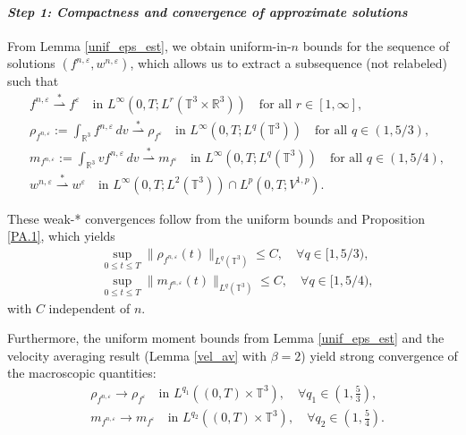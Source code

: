 \documentclass[10pt,reqno]{amsart}
\numberwithin{equation}{section}
\newcommand{\R}{\mathbb R}
\newcommand{\T}{\mathbb T}
\newcommand{\e}{\varepsilon}
\newcommand{\lt}{\left}
\newcommand{\rt}{\right}
\begin{document}
\paragraph{\it Step 1: Compactness and convergence of approximate solutions}

From Lemma \ref{unif_eps_est}, we obtain uniform-in-$n$ bounds for the sequence of solutions $(f^{n,\e}, w^{n,\e})$, which allows us to extract a subsequence (not relabeled) such that
\[
\begin{aligned}
&f^{n,\e} \stackrel{*}{\rightharpoonup} f^\e \quad \text{in } L^\infty(0,T;L^r(\T^3 \times \R^3)) \quad \text{for all } r \in [1,\infty],\\
&\rho_{f^{n,\e}} := \int_{\R^3} f^{n,\e}\,dv \stackrel{*}{\rightharpoonup} \rho_{f^\e} \quad \text{in } L^\infty(0,T;L^q(\T^3)) \quad \text{for all } q \in (1,5/3),\\
&m_{f^{n,\e}} := \int_{\R^3} v f^{n,\e}\,dv \stackrel{*}{\rightharpoonup} m_{f^\e} \quad \text{in } L^\infty(0,T;L^q(\T^3)) \quad \text{for all } q \in (1,5/4),\\
&w^{n,\e} \stackrel{*}{\rightharpoonup} w^\e \quad \text{in } L^\infty(0,T;L^2(\T^3)) \cap L^p(0,T;V^{1,p}).
\end{aligned}
\]

These weak-* convergences follow from the uniform bounds and Proposition \ref{PA.1}, which yields
\[
\begin{aligned}
&\sup_{0 \le t \le T} \|\rho_{f^{n,\e}}(t)\|_{L^q(\T^3)} \le C, \quad \forall q \in [1,5/3), \\
&\sup_{0 \le t \le T} \|m_{f^{n,\e}}(t)\|_{L^q(\T^3)} \le C, \quad \forall q \in [1,5/4),
\end{aligned}
\]
with $C$ independent of $n$.

Furthermore, the uniform moment bounds from Lemma \ref{unif_eps_est} and the velocity averaging result (Lemma \ref{vel_av} with $\beta = 2$) yield strong convergence of the macroscopic quantities:
\[\begin{aligned}
&\rho_{f^{n,\e}} \to \rho_{f^\e} \quad \text{in } L^{q_1}((0,T)\times\T^3), \quad \forall q_1 \in \lt(1,\frac53\rt),\\ 
&m_{f^{n,\e}} \to m_{f^\e} \quad \text{in } L^{q_2}((0,T)\times\T^3), \quad \forall q_2 \in \lt(1,\frac54\rt).
\end{aligned}\]
\end{document}
